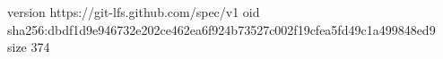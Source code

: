 version https://git-lfs.github.com/spec/v1
oid sha256:dbdf1d9e946732e202ce462ea6f924b73527c002f19cfea5fd49c1a499848ed9
size 374
